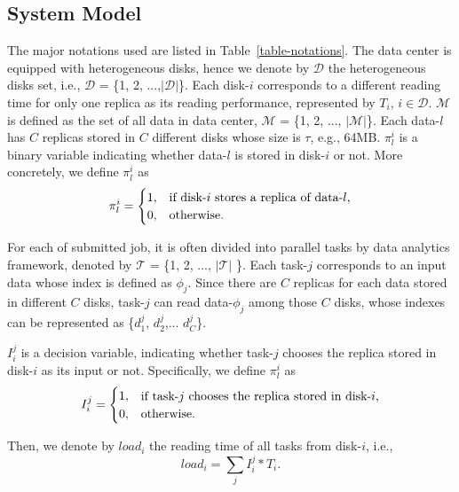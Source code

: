 \documentclass[conference]{IEEEtran}
\makeatletter
\newcommand{\tabincell}[2]{\begin{tabular}{@{}#1@{}}#2\end{tabular}}
\makeatother
\begin{document}
\subsection{System Model}

The major notations used are listed in Table~\ref{table-notations}. The data center is equipped with heterogeneous disks, hence we denote by $\mathcal{D}$ the heterogeneous disks set, i.e., $\mathcal{D}$ = \{1, 2, ...,$|\mathcal{D}|$\}. Each disk-$i$ corresponds to a different reading time for only one replica as its reading performance, represented by $T_i$, $i \in \mathcal{D}$.
$\mathcal{M}$ is defined as the set of all data in data center, $\mathcal{M}$ = \{1, 2, ..., $|\mathcal{M}|$\}. Each data-$l$ has $C$ replicas stored in $C$ different disks whose size is $\tau$, e.g., 64MB. $\pi_l^{i}$ is a binary variable indicating whether data-$l$ is stored in disk-$i$ or not. More concretely, we define $\pi_l^{i}$ as
\begin{equation}
\pi_l^{i} =
\begin{cases}
1, &\text{if disk-$i$ stores a replica of data-$l$,}\\
0, &\text{otherwise.}
\end{cases}\nonumber
\vspace{-0.2cm}
\end{equation}

For each of submitted job, it is often divided into parallel tasks by data analytics framework, denoted by $\mathcal{T}$ = \{1, 2,  ..., $\mathcal{|T|}$ \}. Each task-$j$ corresponds to an input data whose index is defined as $\phi_j$. 
Since there are $C$ replicas for each data stored in different $C$ disks, task-$j$ can read data-$\phi_j$ among those $C$ disks, whose indexes can be represented as \{$d_{1}^j$, $d_{2}^j$,... $d_{C}^j$\}.


$I_i^j$ is a decision variable, indicating whether task-$j$ chooses the replica stored in disk-$i$ as its input or not. Specifically, we define $\pi_l^{i}$ as
\begin{equation}
I_i^j =
\begin{cases}
1, &\text{\tabincell{l}{if task-$j$ chooses the replica stored in disk-$i$,}}\\
0, &\text{otherwise.}
\end{cases}\nonumber
\end{equation}

Then, we denote by $load_i$ the reading time of all tasks from disk-$i$, i.e.,
\begin{equation}
 load_{i} = \sum_{j}I_i^j*T_i. \nonumber
\end{equation}
 
\end{document}
